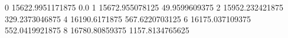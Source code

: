 0 15622.9951171875 0.0
1 15672.955078125 49.9599609375
2 15952.232421875 329.2373046875
4 16190.6171875 567.6220703125
6 16175.037109375 552.0419921875
8 16780.80859375 1157.8134765625
